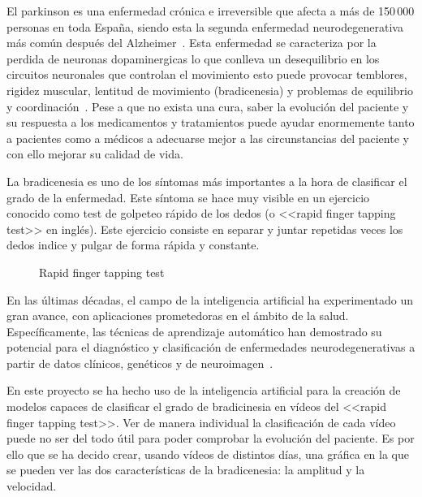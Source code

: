 
El parkinson es una enfermedad crónica e irreversible que afecta a más de 150\,000 personas en toda España, siendo esta la segunda enfermedad neurodegenerativa más común después del Alzheimer~\cite{brainsci11081027}. Esta enfermedad se caracteriza por la perdida de neuronas dopaminergicas lo que conlleva un desequilibrio en los circuitos neuronales que controlan el movimiento esto puede provocar temblores, rigidez muscular, lentitud de movimiento (bradicenesia) y problemas de equilibrio y coordinación~\cite{Poewe_Seppi_Tanner_Halliday_Brundin_Volkmann_Schrag_Lang_2017}.
Pese a que no exista una cura, saber la evolución del paciente y su respuesta a los medicamentos y tratamientos puede ayudar enormemente tanto a pacientes como a médicos a adecuarse mejor a las circunstancias del paciente y con ello mejorar su calidad de vida.
 
La bradicenesia es uno de los síntomas más importantes a la hora de clasificar el grado de la enfermedad. Este síntoma se hace muy visible en un ejercicio conocido como test de golpeteo rápido de los dedos (o <<rapid finger tapping test>> en inglés). Este ejercicio consiste en separar y juntar repetidas veces los dedos indice y pulgar de forma rápida y constante.


\begin{figure}
    \centering
    \caption{Rapid finger tapping test}
    \label{fig:finger-tapping-test}
\end{figure}

En las últimas décadas, el campo de la inteligencia artificial ha experimentado un gran avance, con aplicaciones prometedoras en el ámbito de la salud. Específicamente, las técnicas de aprendizaje automático han demostrado su potencial para el diagnóstico y clasificación de enfermedades neurodegenerativas a partir de datos clínicos, genéticos y de neuroimagen~\cite{CardiacCare}.

En este proyecto se ha hecho uso de la inteligencia artificial para la creación de modelos capaces de clasificar el grado de bradicinesia en vídeos del <<rapid finger tapping test>>. Ver de manera individual la clasificación de cada vídeo puede no ser del todo útil para poder comprobar la evolución del paciente. Es por ello que se ha decido crear, usando vídeos de distintos días, una gráfica en la que se pueden ver las dos características de la bradicenesia: la amplitud y la velocidad. 